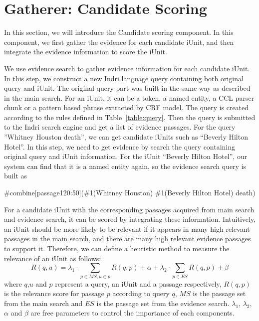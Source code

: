 \section{Gatherer: Candidate Scoring}
In this section, we will introduce the Candidate scoring component.
In this component, we first gather the evidence for each candidate iUnit, and then integrate the evidence information to score the iUnit.

We use evidence search to gather evidence information for each candidate iUnit.
In this step, we construct a new Indri language query containing both original query and iUnit.
The original query part was built in the same way as described in the main search.
For an iUnit, it can be a token, a named entity, a CCL parser chunk or a pattern based phrase extracted by CRF model.
The query is created according to the rules defined in Table~\ref{table:query}.
Then the query is submitted to the Indri search engine and get a list of evidence passages.
For the query ''Whitney Houston death'', we can get candidate iUnits such as ``Beverly Hilton Hotel''. 
In this step, we need to get evidence by search the query containing original query and iUnit information.
For the iUnit ``Beverly Hilton Hotel'', our system can find that it is a named entity again, so the evidence search query is built as 

\begin{center}
\#combine[passage120:50](\#1(Whitney Houston) \#1(Beverly Hilton Hotel) death)
\end{center}

For a candidate iUnit with the corresponding passages acquired from main search and evidence search, it can be scored by integrating these information.
Intuitively, an iUnit should be more likely to be relevant if it appears in many high relevant passages in the main search, and there are many high relevant evidence passages to support it.
Therefore, we can define a heuristic method to measure the relevance of an iUnit as follows:
\begin{equation}
R(q,u)= \lambda_1 \cdot \sum_{p\in MS, u\in p}{R(q,p) + \alpha} + \lambda_2 \cdot \sum_{p\in ES}{R(q,p) + \beta}
\end{equation}
where $q$,$u$ and $p$ represent a query, an iUnit and a passage respectively, $R(q,p)$ is the relevance score for passage $p$ according to query $q$, $MS$ is the passage set from the main search and $ES$ is the passage set from the evidence search. $\lambda_1$, $\lambda_2$, $\alpha$ and $\beta$ are free parameters to control the importance of each components.

